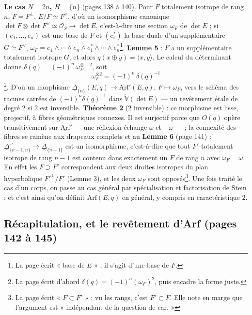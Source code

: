 \documentclass[11pt,a4paper]{article}
\begin{document}
\textbf{Le cas $N = 2n$, $H = \{n\}$} (pages 138 à 140). Pour $F$ totalement isotrope
de rang $n$, $F = F^{\perp}$, $E/F \simeq F^{\vee}$, d'où un isomorphisme canonique
$\det F \otimes \det F^{\vee} \simeq \mathcal{O}_S \to \det E$, c'est-à-dire une section
$\omega_F$ de $\det E$ ; si $(e_1, \ldots, e_n)$ est une base de $F$ et $(e_i^{*})$ la
base duale d'un supplémentaire $G \simeq F^{\vee}$, $\omega_F = e_1 \wedge \cdots
\wedge e_n \wedge e_1^{*} \wedge \cdots \wedge e_n^{*}$\footnote{La page écrit « base de
$E$ » ; il s'agit d'une base de $F$.}. \textbf{Lemme 5} : $F$ a un supplémentaire
totalement isotrope $G$, et alors $q(x \oplus y) = \langle x, y\rangle$. Le calcul du
déterminant donne $\delta(q) = (-1)^n\,\omega_F^{\otimes -2}$, soit
\[
  \omega_F^{\otimes 2} = (-1)^n\,\delta(q)^{-1}
\]
\footnote{La page écrit d'abord $\delta(q) = (-1)^n(\omega_F)^2$, puis encadre la forme
juste.}. D'où un morphisme $\underline{\Delta}_{\{n\}}(E, q) \to
\underline{\mathrm{Arf}}'(E, q)$, $F \mapsto \omega_F$, vers le schéma des racines carrées
de $(-1)^n\delta(q)^{-1}$ dans $\check{\mathbb{V}}(\det E)$ — un revêtement étale de
degré $2$ si $2$ est inversible. \textbf{Théorème 2} ($2$ inversible) : ce morphisme
est lisse, projectif, à fibres géométriques connexes. Il est surjectif parce que $O(q)$
opère transitivement sur $\underline{\mathrm{Arf}}'$ — une réflexion échange $\omega$
et $-\omega$ — ; la connexité des fibres se ramène aux drapeaux complets et au
\textbf{Lemme 6} (page 141) : $\underline{\Delta}^{\omega}_{\{n-1, n\}} \to
\underline{\Delta}_{\{n-1\}}$ est un isomorphisme, c'est-à-dire que tout $F'$ totalement
isotrope de rang $n - 1$ est contenu dans exactement un $F$ de rang $n$ avec $\omega_F =
\omega$. En effet les $F \supset F'$ correspondent aux deux droites isotropes du plan
hyperbolique $F'^{\perp}/F'$ (Lemme 3), et les deux $\omega_F$ sont opposés\footnote{La
page écrit « $F \subset F'$ » ; vu les rangs, c'est $F' \subset F$. Elle note en marge
que l'argument est « indépendant de la question de car. »}. Une fois traité le cas
d'un corps, on passe au cas général par spécialisation et factorisation de Stein ; et
c'est ainsi qu'on définit $\underline{\mathrm{Arf}}(E, q)$ en général, y compris en
caractéristique $2$.

\subsection*{Récapitulation, et le revêtement d'Arf (pages 142 à 145)}
\end{document}
